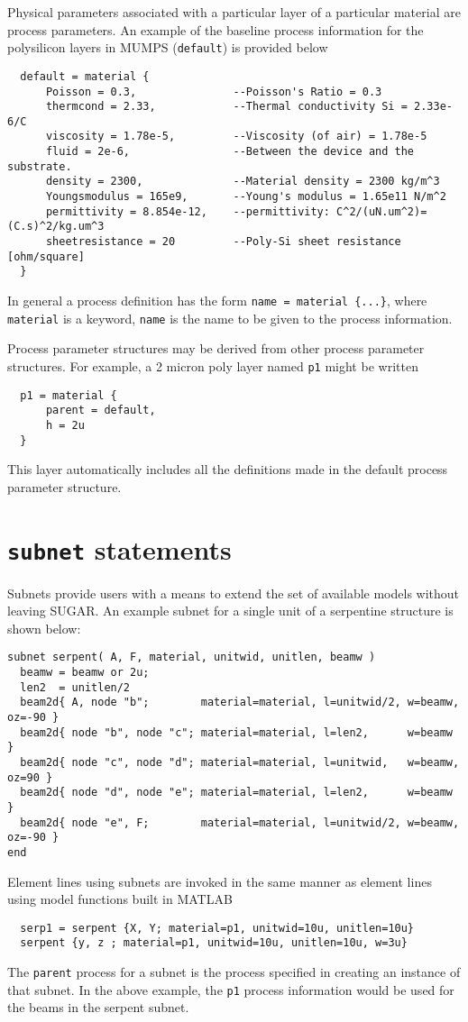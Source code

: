 Physical parameters associated with a particular layer of a particular
material are process parameters.  An example of the baseline process
information for the polysilicon layers in MUMPS (\texttt{default}) is provided
below
\begin{verbatim}
  default = material { 
      Poisson = 0.3,               --Poisson's Ratio = 0.3
      thermcond = 2.33,            --Thermal conductivity Si = 2.33e-6/C
      viscosity = 1.78e-5,         --Viscosity (of air) = 1.78e-5
      fluid = 2e-6,                --Between the device and the substrate.
      density = 2300,              --Material density = 2300 kg/m^3
      Youngsmodulus = 165e9,       --Young's modulus = 1.65e11 N/m^2
      permittivity = 8.854e-12,    --permittivity: C^2/(uN.um^2)=(C.s)^2/kg.um^3
      sheetresistance = 20         --Poly-Si sheet resistance [ohm/square]
  }
\end{verbatim}

In general a process definition has the form \texttt{name = material \{...\}},
where \texttt{material} is a keyword, \texttt{name} is the name to be given 
to the process information.

Process parameter structures may be derived from other process parameter
structures.  For example, a 2 micron poly layer named \texttt{p1} might be 
written
\begin{verbatim}
  p1 = material {
      parent = default,
      h = 2u
  }
\end{verbatim}
This layer automatically includes all the definitions made in the default
process parameter structure.


\section{\texttt{subnet} statements}

Subnets provide users with a means to extend the set of available models
without leaving SUGAR.  An example subnet for a single unit of a serpentine
structure is shown below:
\begin{verbatim}
subnet serpent( A, F, material, unitwid, unitlen, beamw )
  beamw = beamw or 2u;
  len2  = unitlen/2
  beam2d{ A, node "b";        material=material, l=unitwid/2, w=beamw, oz=-90 }
  beam2d{ node "b", node "c"; material=material, l=len2,      w=beamw }
  beam2d{ node "c", node "d"; material=material, l=unitwid,   w=beamw, oz=90 }
  beam2d{ node "d", node "e"; material=material, l=len2,      w=beamw }
  beam2d{ node "e", F;        material=material, l=unitwid/2, w=beamw, oz=-90 }
end
\end{verbatim}
Element lines using subnets are invoked in the same manner as element lines
using model functions built in MATLAB
\begin{verbatim}
  serp1 = serpent {X, Y; material=p1, unitwid=10u, unitlen=10u}
  serpent {y, z ; material=p1, unitwid=10u, unitlen=10u, w=3u}
\end{verbatim}
The \texttt{parent} process for a subnet is the process specified in creating
an instance of that subnet.  In the above example, the \texttt{p1} process
information would be used for the beams in the serpent subnet.

